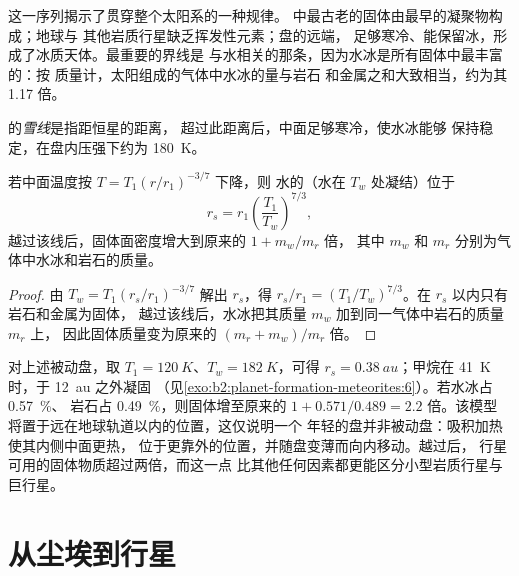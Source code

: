 这一序列揭示了贯穿整个太阳系的一种规律。
中最古老的固体由最早的凝聚物构成；地球与
其他岩质行星缺乏挥发性元素；盘的远端，
足够寒冷、能保留冰，形成了冰质天体。最重要的界线是
与水相关的那条，因为水冰是所有固体中最丰富的：按
质量计，太阳组成的气体中水冰的量与岩石
和金属之和大致相当，约为其 \num{1.17} 倍。

\begin{definition}[雪线]\label{def:b2:planet-formation-meteorites:snow-line}
的\emph{雪线}是指距恒星的距离，
超过此距离后，中面足够寒冷，使水冰能够
保持稳定，在盘内压强下约为 \qty{180}{K}。
\end{definition}

\begin{proposition}[被动盘的雪线]
\label{prop:b2:planet-formation-meteorites:snow-line}
若中面温度按 $T = T_1 (r/r_1)^{-3/7}$ 下降，则
水的（水在 $T_w$ 处凝结）位于
\[
  r_s = r_1 \left(\frac{T_1}{T_w}\right)^{7/3},
\]
越过该线后，固体面密度增大到原来的 $1 + m_w/m_r$ 倍，
其中 $m_w$ 和 $m_r$ 分别为气体中水冰和岩石的质量。
\end{proposition}

\begin{proof}
由 $T_w = T_1 (r_s/r_1)^{-3/7}$ 解出 $r_s$，得
$r_s/r_1 = (T_1/T_w)^{7/3}$。在 $r_s$ 以内只有岩石和金属为固体，
越过该线后，水冰把其质量 $m_w$ 加到同一气体中岩石的质量 $m_r$ 上，
因此固体质量变为原来的 $(m_r + m_w)/m_r$ 倍。
\end{proof}

对上述被动盘，取 $T_1 = \qty{120}{K}$、$T_w = \qty{182}{K}$，可得
$r_s = \qty{0.38}{au}$；甲烷在 \qty{41}{K} 时，于 \qty{12}{au} 之外凝固
（见\cref{exo:b2:planet-formation-meteorites:6}）。若水冰占 \qty{0.57}{\percent}、
岩石占 \qty{0.49}{\percent}，则固体增至原来的 $1 + 0.571/0.489 = 2.2$ 倍。该模型
将置于远在地球轨道以内的位置，这仅说明一个
年轻的盘并非被动盘：吸积加热使其内侧中面更热，
位于更靠外的位置，并随盘变薄而向内移动。越过后，
行星可用的固体物质超过两倍，而这一点
比其他任何因素都更能区分小型岩质行星与
巨行星。

\section{从尘埃到行星}


